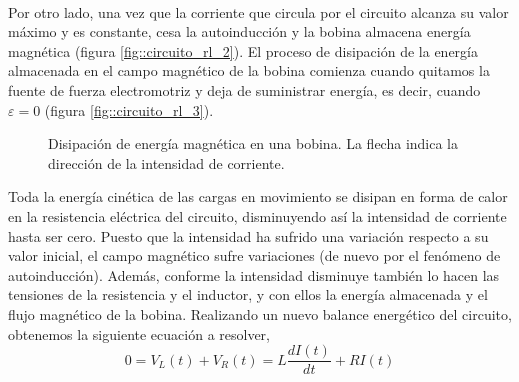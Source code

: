 \documentclass[../main.tex]{subfiles}
\begin{document}
\hphantom{1}\\    
Por otro lado, una vez que la corriente que circula por el circuito alcanza su valor máximo y es constante, cesa la autoinducción y la bobina almacena energía magnética (figura \ref{fig::circuito_rl_2}). El proceso de disipación de la energía almacenada en el campo magnético de la bobina comienza cuando quitamos la fuente de fuerza electromotriz y deja de suministrar energía, es decir, cuando $\varepsilon = 0$ (figura \ref{fig::circuito_rl_3}). \\
    

 \begin{figure}[!h]
    \centering
    \caption{Disipación de energía magnética en una bobina. La flecha indica la dirección de la intensidad de corriente.}
    \label{fig::carga_bobina}
\end{figure}

Toda la energía cinética de las cargas en movimiento se disipan en forma de calor en la resistencia eléctrica del circuito, disminuyendo así la intensidad de corriente hasta ser cero. Puesto que la intensidad ha sufrido una variación respecto a su valor inicial, el campo magnético sufre variaciones (de nuevo por el fenómeno de autoinducción). Además, conforme la intensidad disminuye también lo hacen las tensiones de la resistencia y el inductor, y con ellos la energía almacenada y el flujo magnético de la bobina. Realizando un nuevo balance energético del circuito, obtenemos la siguiente ecuación a resolver, 
\begin{equation}
    \label{eqq::descarga_bobina}
    0 = V_L(t) + V_R(t) = L \frac{d I(t)}{d t} + R I(t)
\end{equation}
\end{document}
